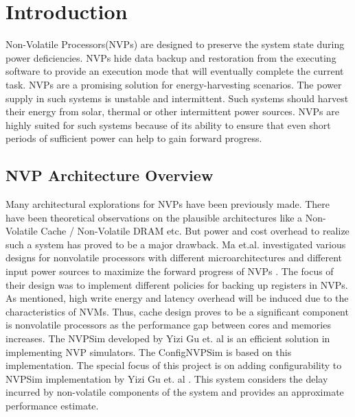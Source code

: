 \documentclass[conference]{IEEEtran}
\begin{document}
\section{ \textbf{Introduction}}
Non-Volatile Processors(NVPs) are designed to preserve the system state during power deficiencies. NVPs hide data backup and restoration from the executing software to provide an execution mode that will eventually complete the current task. NVPs are a promising solution for energy-harvesting scenarios. The power supply in such systems is unstable and intermittent. Such systems should harvest their energy from solar, thermal or other intermittent power sources. NVPs are highly suited for such systems because of its ability to ensure that even short periods of sufficient power can help to gain forward progress. 
\subsection{NVP Architecture Overview}
 Many architectural explorations for NVPs have been previously made. There have been theoretical observations on the plausible architectures like a Non-Volatile Cache / Non-Volatile DRAM etc. But power and cost overhead to realize such a system has proved to be a major drawback. Ma et.al. investigated various designs for nonvolatile processors with different microarchitectures and different input power sources to maximize the forward progress of NVPs \cite{b4}. The focus of their design was to implement different policies for backing up registers in NVPs. As mentioned, high write energy and latency overhead will be induced due to the characteristics of NVMs. Thus, cache design proves to be a significant component is nonvolatile processors as the performance gap between cores and memories increases. The NVPSim developed by Yizi Gu et. al is an efficient solution in implementing NVP simulators. The ConfigNVPSim is based on this implementation. The special focus of this project is on adding configurability to NVPSim implementation by Yizi Gu et. al \cite{b1}. This system considers the delay incurred by non-volatile components of the system and provides an approximate performance estimate.
\end{document}
